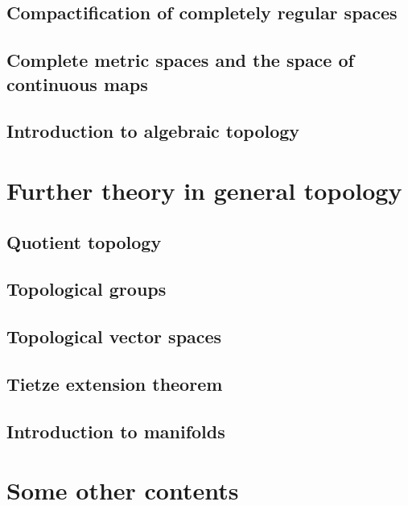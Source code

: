 \chapter{Compactification of completely regular spaces}\label{compactification}
    
    

\chapter{Complete metric spaces and the space of continuous maps}\label{completeness and C0 spaces}
    
    
    
    

\chapter{Introduction to algebraic topology}\label{fundamental groups}
    
    
    
    




\part{Further theory in general topology}

\chapter{Quotient topology}\label{quotient topology}
    
    

\chapter{Topological groups}\label{topological groups}
    
    
    

\chapter{Topological vector spaces}\label{topological vector spaces}
    
    

\chapter{Tietze extension theorem}\label{Tietze extn thm}
    

\chapter{Introduction to manifolds}\label{introduction to manifolds}
    




\part{Some other contents}


